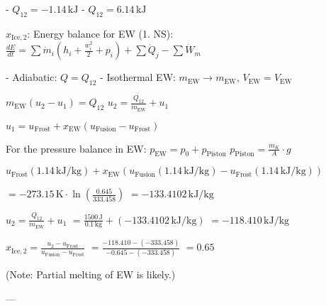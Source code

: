 - \( Q_{12} = -1.14 \, \text{kJ} \)  
- \( Q_{12} = 6.14 \, \text{kJ} \)  

\( x_{\text{Ice},2} \):  
Energy balance for EW (1. NS):  
\( \frac{dE}{dt} = \sum \dot{m}_i (h_i + \frac{w_i^2}{2} + p_i) + \sum \dot{Q}_j - \sum \dot{W}_m \)  

- Adiabatic: \( Q = Q_{12} \)  
- Isothermal EW: \( m_{\text{EW}} \to m_{\text{EW}} \), \( V_{\text{EW}} = V_{\text{EW}} \)  

\( m_{\text{EW}} (u_2 - u_1) = Q_{12} \)  
\( u_2 = \frac{Q_{12}}{m_{\text{EW}}} + u_1 \)  

\( u_1 = u_{\text{Frost}} + x_{\text{EW}} (u_{\text{Fusion}} - u_{\text{Frost}}) \)  

For the pressure balance in EW:  
\( p_{\text{EW}} = p_0 + p_{\text{Piston}} \)  
\( p_{\text{Piston}} = \frac{m_K}{A} \cdot g \)  

\( u_{\text{Frost}} (1.14 \, \text{kJ/kg}) + x_{\text{EW}} (u_{\text{Fusion}} (1.14 \, \text{kJ/kg}) - u_{\text{Frost}} (1.14 \, \text{kJ/kg})) \)  

\( = -273.15 \, \text{K} \cdot \ln \left( \frac{0.645}{333.458} \right) \)  
\( = -133.4102 \, \text{kJ/kg} \)  

\( u_2 = \frac{Q_{12}}{m_{\text{EW}}} + u_1 \)  
\( = \frac{1500 \, \text{J}}{0.1 \, \text{kg}} + (-133.4102 \, \text{kJ/kg}) \)  
\( = -118.410 \, \text{kJ/kg} \)  

\( x_{\text{Ice},2} = \frac{u_2 - u_{\text{Frost}}}{u_{\text{Fusion}} - u_{\text{Frost}}} \)  
\( = \frac{-118.410 - (-333.458)}{-0.645 - (-333.458)} \)  
\( = 0.65 \)  

(Note: Partial melting of EW is likely.)  

---